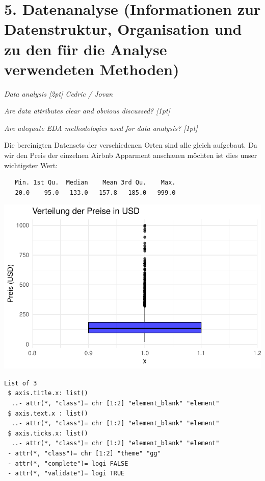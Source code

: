 \documentclass[
  journal,
]{IEEEtran}%
\begin{document}
\hypertarget{datenanalyse-informationen-zur-datenstruktur-organisation-und-zu-den-fuxfcr-die-analyse-verwendeten-methoden}{%
\section{5. Datenanalyse (Informationen zur Datenstruktur, Organisation
und zu den für die Analyse verwendeten
Methoden)}\label{datenanalyse-informationen-zur-datenstruktur-organisation-und-zu-den-fuxfcr-die-analyse-verwendeten-methoden}}

\emph{Data analysis {[}2pt{]} Cedric / Jovan}

\emph{Are data attributes clear and obvious discussed? {[}1pt{]}}

\emph{Are adequate EDA methodologies used for data analysis? {[}1pt{]}}

Die bereinigten Datensets der verschiedenen Orten sind alle gleich
aufgebaut. Da wir den Preis der einzelnen Airbnb Apparment anschauen
möchten ist dies unser wichtigster Wert:

\begin{verbatim}
   Min. 1st Qu.  Median    Mean 3rd Qu.    Max. 
   20.0    95.0   133.0   157.8   185.0   999.0 
\end{verbatim}

\includegraphics{main_files/figure-pdf/unnamed-chunk-5-1.pdf}

\begin{verbatim}
List of 3
 $ axis.title.x: list()
  ..- attr(*, "class")= chr [1:2] "element_blank" "element"
 $ axis.text.x : list()
  ..- attr(*, "class")= chr [1:2] "element_blank" "element"
 $ axis.ticks.x: list()
  ..- attr(*, "class")= chr [1:2] "element_blank" "element"
 - attr(*, "class")= chr [1:2] "theme" "gg"
 - attr(*, "complete")= logi FALSE
 - attr(*, "validate")= logi TRUE
\end{verbatim}
\end{document}
